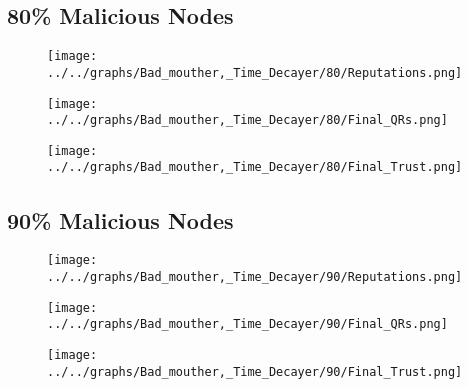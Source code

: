 \begin{minipage}[t]{0.49\columnwidth}
\subsection*{80\% Malicious Nodes}
    \begin{figure}[H]
        \centering
        \texttt{[image: ../../graphs/Bad\_mouther,\_Time\_Decayer/80/Reputations.png]}
    \end{figure}
    \begin{figure}[H]
        \centering
        \texttt{[image: ../../graphs/Bad\_mouther,\_Time\_Decayer/80/Final\_QRs.png]}
    \end{figure}
\end{minipage}
\begin{minipage}[t]{0.49\columnwidth}
    \begin{figure}[H]
        \centering
        \texttt{[image: ../../graphs/Bad\_mouther,\_Time\_Decayer/80/Final\_Trust.png]}
    \end{figure}
\end{minipage}

\begin{minipage}[t]{0.49\columnwidth}
\subsection*{90\% Malicious Nodes}
    \begin{figure}[H]
        \centering
        \texttt{[image: ../../graphs/Bad\_mouther,\_Time\_Decayer/90/Reputations.png]}
    \end{figure}
    \begin{figure}[H]
        \centering
        \texttt{[image: ../../graphs/Bad\_mouther,\_Time\_Decayer/90/Final\_QRs.png]}
    \end{figure}
\end{minipage}
\begin{minipage}[t]{0.49\columnwidth}
    \begin{figure}[H]
        \centering
        \texttt{[image: ../../graphs/Bad\_mouther,\_Time\_Decayer/90/Final\_Trust.png]}
    \end{figure}
\end{minipage}
\newpage

